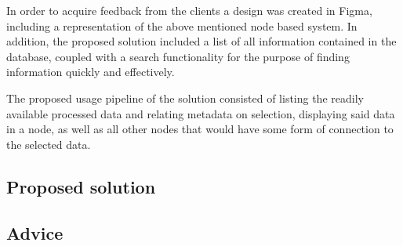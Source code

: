 In order to acquire feedback from the clients a design was created in Figma, including a representation of the above mentioned node based system. In addition, the proposed solution included a list of all information contained in the database, coupled with a search functionality for the purpose of finding information quickly and effectively.

The proposed usage pipeline of the solution consisted of listing the readily available processed data and relating metadata on selection, displaying said data in a node, as well as all other nodes that would have some form of connection to the selected data.


\subsection{Proposed solution}
\label{subsec:Proposed solution}

\subsection{Advice}
\label{subsec:Advice}

